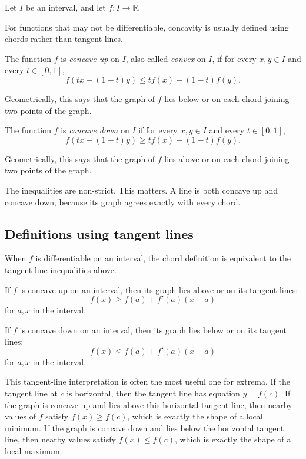 \documentclass{essay}
\begin{document}
Let \(I\) be an interval, and let \(f:I\to\mathbb{R}\).

For functions that may not be differentiable, concavity is usually defined using chords rather than tangent lines.

The function \(f\) is \emph{concave up} on \(I\), also called \emph{convex} on \(I\), if for every \(x,y\in I\) and every \(t\in[0,1]\),
\[ f(tx+(1-t)y) \leq t f(x)+(1-t)f(y). \]

Geometrically, this says that the graph of \(f\) lies below or on each chord joining two points of the graph.

The function \(f\) is \emph{concave down} on \(I\) if for every \(x,y\in I\) and every \(t\in[0,1]\),
\[ f(tx+(1-t)y) \geq t f(x)+(1-t)f(y). \]

Geometrically, this says that the graph of \(f\) lies above or on each chord joining two points of the graph.

The inequalities are non-strict. This matters. A line is both concave up and concave down, because its graph agrees exactly with every chord.

\subsection{Definitions using tangent lines}

When \(f\) is differentiable on an interval, the chord definition is equivalent to the tangent-line inequalities above.

If \(f\) is concave up on an interval, then its graph lies above or on its tangent lines:
\[ f(x)\geq f(a)+f'(a)(x-a) \]
for \(a,x\) in the interval.

If \(f\) is concave down on an interval, then its graph lies below or on its tangent lines:
\[ f(x)\leq f(a)+f'(a)(x-a) \]
for \(a,x\) in the interval.

This tangent-line interpretation is often the most useful one for extrema. If the tangent line at \(c\) is horizontal, then the tangent line has equation \(y=f(c)\). If the graph is concave up and lies above this horizontal tangent line, then nearby values of \(f\) satisfy \(f(x)\geq f(c)\), which is exactly the shape of a local minimum. If the graph is concave down and lies below the horizontal tangent line, then nearby values satisfy \(f(x)\leq f(c)\), which is exactly the shape of a local maximum.
\end{document}

